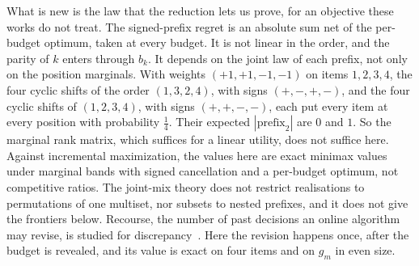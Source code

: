 What is new is the law that the reduction lets us prove, for an objective these works do not
treat. The signed-prefix regret is an absolute sum net of the per-budget optimum, taken at
every budget. It is not linear in the order, and the parity of $k$ enters through $b_{k}$. It
depends on the joint law of each prefix, not only on the position marginals. With weights
$(+1,+1,-1,-1)$ on items $1,2,3,4$, the four cyclic shifts of the order $(1,3,2,4)$, with signs
$(+,-,+,-)$, and the four cyclic shifts of $(1,2,3,4)$, with signs $(+,+,-,-)$, each put every item
at every position with probability $\frac14$. Their expected $|\text{prefix}_{2}|$ are $0$ and
$1$. So the marginal rank matrix, which suffices for a linear utility, does not
suffice here. Against incremental maximization, the values here are exact minimax values under
marginal bands with signed cancellation and a per-budget optimum, not competitive ratios. The
joint-mix theory does not restrict realisations to permutations of one multiset, nor subsets to
nested prefixes, and it does not give the frontiers below. Recourse, the number of past
decisions an online algorithm may revise, is studied for discrepancy~\cite{gupta2022}. Here the
revision happens once, after the budget is revealed, and its value is exact on four items and on
$g_m$ in even size.

